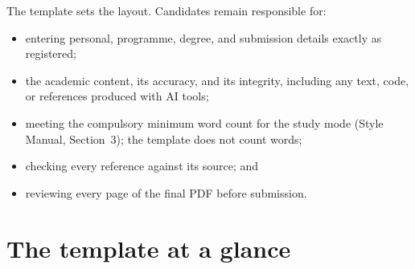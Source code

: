\documentclass[11pt,a4paper]{article}
\begin{document}
The template sets the layout. Candidates remain responsible for:

\begin{itemize}
  \item entering personal, programme, degree, and submission details exactly as
        registered;
  \item the academic content, its accuracy, and its integrity, including any
        text, code, or references produced with AI tools;
  \item meeting the compulsory minimum word count for the study mode
        (Style Manual, Section~3); the template does not count words;
  \item checking every reference against its source; and
  \item reviewing every page of the final PDF before submission.
\end{itemize}

\section{The template at a glance}
\end{document}
